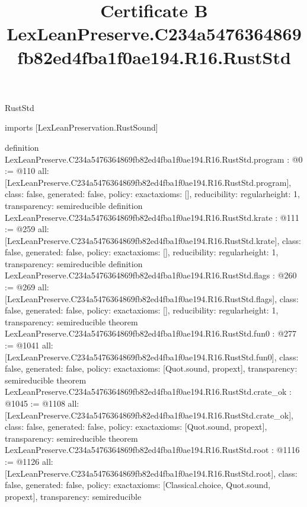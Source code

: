 \begin{lexlean}{RustStd}
\title{Certificate B LexLeanPreserve.C234a5476364869fb82ed4fba1f0ae194.R16.RustStd}
\begin{coremodule}
imports [LexLeanPreservation.RustSound]

definition LexLeanPreserve.C234a5476364869fb82ed4fba1f0ae194.R16.RustStd.program : @0 := @110 {
  all: [LexLeanPreserve.C234a5476364869fb82ed4fba1f0ae194.R16.RustStd.program],
  class: false,
  generated: false,
  policy: exact{axioms: []},
  reducibility: regular{height: 1},
  transparency: semireducible
}
definition LexLeanPreserve.C234a5476364869fb82ed4fba1f0ae194.R16.RustStd.krate : @111 := @259 {
  all: [LexLeanPreserve.C234a5476364869fb82ed4fba1f0ae194.R16.RustStd.krate],
  class: false,
  generated: false,
  policy: exact{axioms: []},
  reducibility: regular{height: 1},
  transparency: semireducible
}
definition LexLeanPreserve.C234a5476364869fb82ed4fba1f0ae194.R16.RustStd.flags : @260 := @269 {
  all: [LexLeanPreserve.C234a5476364869fb82ed4fba1f0ae194.R16.RustStd.flags],
  class: false,
  generated: false,
  policy: exact{axioms: []},
  reducibility: regular{height: 1},
  transparency: semireducible
}
theorem LexLeanPreserve.C234a5476364869fb82ed4fba1f0ae194.R16.RustStd.fun0 : @277 := @1041 {
  all: [LexLeanPreserve.C234a5476364869fb82ed4fba1f0ae194.R16.RustStd.fun0],
  class: false,
  generated: false,
  policy: exact{axioms: [Quot.sound, propext]},
  transparency: semireducible
}
theorem LexLeanPreserve.C234a5476364869fb82ed4fba1f0ae194.R16.RustStd.crate_ok : @1045 := @1108 {
  all: [LexLeanPreserve.C234a5476364869fb82ed4fba1f0ae194.R16.RustStd.crate_ok],
  class: false,
  generated: false,
  policy: exact{axioms: [Quot.sound, propext]},
  transparency: semireducible
}
theorem LexLeanPreserve.C234a5476364869fb82ed4fba1f0ae194.R16.RustStd.root : @1116 := @1126 {
  all: [LexLeanPreserve.C234a5476364869fb82ed4fba1f0ae194.R16.RustStd.root],
  class: false,
  generated: false,
  policy: exact{axioms: [Classical.choice, Quot.sound, propext]},
  transparency: semireducible
}


\end{coremodule}
\end{lexlean}
